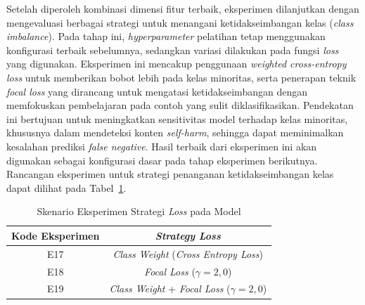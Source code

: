 Setelah diperoleh kombinasi dimensi fitur terbaik, eksperimen dilanjutkan dengan mengevaluasi berbagai strategi untuk menangani ketidakseimbangan kelas (\textit{class imbalance}). Pada tahap ini, \textit{hyperparameter} pelatihan tetap menggunakan konfigurasi terbaik sebelumnya, sedangkan variasi dilakukan pada fungsi \textit{loss} yang digunakan. Eksperimen ini mencakup penggunaan \textit{weighted cross-entropy loss} untuk memberikan bobot lebih pada kelas minoritas, serta penerapan teknik \textit{focal loss} yang dirancang untuk mengatasi ketidakseimbangan dengan memfokuskan pembelajaran pada contoh yang sulit diklasifikasikan. Pendekatan ini bertujuan untuk meningkatkan sensitivitas model terhadap kelas minoritas, khususnya dalam mendeteksi konten \textit{self-harm}, sehingga dapat meminimalkan kesalahan prediksi \textit{false negative}. Hasil terbaik dari eksperimen ini akan digunakan sebagai konfigurasi dasar pada tahap eksperimen berikutnya. Rancangan eksperimen untuk strategi penanganan ketidakseimbangan kelas dapat dilihat pada Tabel~\ref{tabel:strategi_penanganan_imbalance_multimodal}.

\begin{table}[H]
    \centering
    \caption{Skenario Eksperimen Strategi \textit{Loss} pada Model}
    \label{tabel:strategi_penanganan_imbalance_multimodal}
    \small
    \setlength{\tabcolsep}{8pt}
    \renewcommand{\arraystretch}{1.1}
    \begin{tabular}{c c}
        \hline
        \textbf{Kode Eksperimen} & \textbf{\textit{Strategy Loss}} \\
        \hline
        E17 & \textit{Class Weight} (\textit{Cross Entropy Loss}) \\
        E18 & \textit{Focal Loss} ($\gamma = 2{,}0$) \\
        E19 & \textit{Class Weight} + \textit{Focal Loss} ($\gamma = 2{,}0$) \\
        \hline
    \end{tabular}
\end{table}

